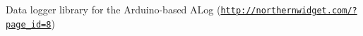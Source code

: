 Data logger library for the Arduino-\/based A\+Log (\href{http://northernwidget.com/?page_id=8}{\tt http\+://northernwidget.\+com/?page\+\_\+id=8}) 